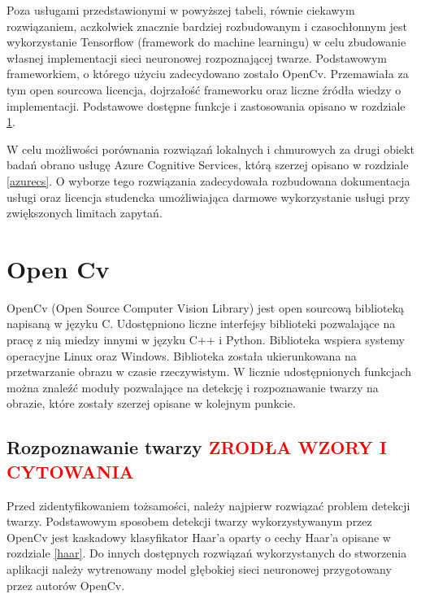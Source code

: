 Poza usługami przedstawionymi w powyższej tabeli, równie ciekawym rozwiązaniem, aczkolwiek znacznie bardziej rozbudowanym i czasochłonnym jest wykorzystanie Tensorflow (framework do machine learningu) w celu zbudowanie własnej implementacji sieci neuronowej rozpoznającej twarze.
Podstawowym frameworkiem, o którego użyciu zadecydowano zostało OpenCv. Przemawiała za tym open sourcowa licencja, dojrzałość frameworku oraz liczne źródła wiedzy o implementacji. Podstawowe dostępne funkcje i zastosowania opisano w rozdziale \ref{s:open_cv}.

W celu możliwości porównania rozwiązań lokalnych i chmurowych za drugi obiekt badań obrano usługę Azure Cognitive Services, którą szerzej opisano w rozdziale \ref{azurecs}. O wyborze tego rozwiązania zadecydowała rozbudowana dokumentacja usługi oraz licencja studencka umożliwiająca darmowe wykorzystanie usługi przy zwiększonych limitach zapytań.

\section{Open Cv} \label{s:open_cv}
OpenCv (Open Source Computer Vision Library) jest open sourcową biblioteką napisaną w języku C. Udostępniono liczne interfejsy biblioteki pozwalające na pracę z nią miedzy innymi w języku C++ i Python. Biblioteka wspiera systemy operacyjne Linux oraz Windows. Biblioteka została ukierunkowana na przetwarzanie obrazu w czasie rzeczywistym. W licznie udostępnionych funkcjach można znaleźć moduły pozwalające na detekcję i rozpoznawanie twarzy na obrazie, które zostały szerzej opisane w kolejnym punkcie.

\subsection{Rozpoznawanie twarzy \textcolor{red}{ZRODŁA WZORY I CYTOWANIA}}
Przed zidentyfikowaniem tożsamości, należy najpierw rozwiązać problem detekcji twarzy. Podstawowym sposobem detekcji twarzy wykorzystywanym przez OpenCv jest kaskadowy klasyfikator Haar'a oparty o cechy Haar'a opisane w rozdziale \ref{haar}. Do innych dostępnych rozwiązań wykorzystanych do stworzenia aplikacji należy wytrenowany model głębokiej sieci neuronowej przygotowany przez autorów OpenCv.
